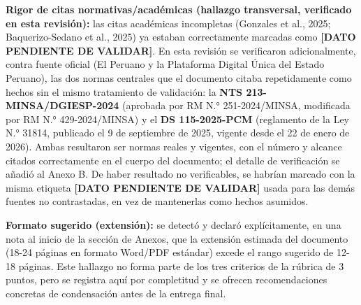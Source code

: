 \documentclass[11pt,a4paper]{article}
\begin{document}
\textbf{Rigor de citas normativas/académicas (hallazgo transversal, verificado en esta revisión):} las citas académicas incompletas (Gonzales et al., 2025; Baquerizo-Sedano et al., 2025) ya estaban correctamente marcadas como \textbf{{[}DATO PENDIENTE DE VALIDAR{]}}. En esta revisión se verificaron adicionalmente, contra fuente oficial (El Peruano y la Plataforma Digital Única del Estado Peruano), las dos normas centrales que el documento citaba repetidamente como hechos sin el mismo tratamiento de validación: la \textbf{NTS 213-MINSA/DGIESP-2024} (aprobada por RM N.° 251-2024/MINSA, modificada por RM N.° 429-2024/MINSA) y el \textbf{DS 115-2025-PCM} (reglamento de la Ley N.° 31814, publicado el 9 de septiembre de 2025, vigente desde el 22 de enero de 2026). Ambas resultaron ser normas reales y vigentes, con el número y alcance citados correctamente en el cuerpo del documento; el detalle de verificación se añadió al Anexo B. De haber resultado no verificables, se habrían marcado con la misma etiqueta \textbf{{[}DATO PENDIENTE DE VALIDAR{]}} usada para las demás fuentes no contrastadas, en vez de mantenerlas como hechos asumidos.

\textbf{Formato sugerido (extensión):} se detectó y declaró explícitamente, en una nota al inicio de la sección de Anexos, que la extensión estimada del documento (18-24 páginas en formato Word/PDF estándar) excede el rango sugerido de 12-18 páginas. Este hallazgo no forma parte de los tres criterios de la rúbrica de 3 puntos, pero se registra aquí por completitud y se ofrecen recomendaciones concretas de condensación antes de la entrega final.
\end{document}
